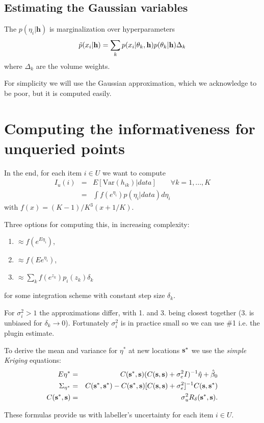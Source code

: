 \documentclass[10pt, onecolumn]{article}
\newcommand{\y}{\mathbf{h}}
\begin{document}
\subsection{Estimating the Gaussian variables}

The $p(\eta_i|\y)$ is marginalization over hyperparameters
\begin{eqnarray}
\tilde p(x_i|\y) = \sum_k p(x_i|\bold\theta_k, \y) p(\bold\theta_k | \y) \Delta_k
\end{eqnarray}
where $\Delta_k$ are the volume weights.

For simplicity we will use the Gaussian approximation, which we acknowledge to be poor, but it is computed easily.


\section*{Computing the informativeness for unqueried points}

In the end, for each item $i\in U$ we want to compute 
\begin{eqnarray}
I_u(i) &=& E[\mathrm{Var }(h_{ik}) | data]\qquad \forall k=1,...,K\\
&=& \int f(e^{\eta_i}) p(\eta_i | data) d\eta_i
\end{eqnarray}
with $f(x)=(K-1)/K^3(x+1/K)$.

Three options for computing this, in increasing complexity:
\begin{enumerate}
\item $\approx f(e^{E \eta_i})$,
\item $\approx f(E e^{\eta_i})$,
\item $\approx \sum_k f(e^{z_{k}})p_i(z_k) \delta_k$
\end{enumerate}
for some integration scheme with constant step size $\delta_k$. 

For $\sigma_i^2>1$ the approximations differ, with 1. and 3. being closest together (3. is unbiased for $\delta_k \rightarrow 0$). Fortunately $\sigma_i^2$ is in practice small so we can use \#1 i.e. the plugin estimate.

To derive the mean and variance for $\eta^*$ at new locations $\bold s^*$ we use the \textit{simple Kriging} equations:
\begin{eqnarray}
E\eta^*  &=&  C(\bold s^*, \bold s)(C(\bold s, \bold s)+\sigma_e^2 I)^{-1} \hat \eta + \hat \beta_0\\
\Sigma_{\eta^*} &=& C(\bold s^*, \bold s^*) - C(\bold s^*, \bold s)[C(\bold s, \bold s) + \sigma_e^2]^{-1} C(\bold s,\bold s^*)\\
C(\bold s^*, \bold s) &=& \sigma_u^2 R_\delta(\bold s^*,\bold s).
\end{eqnarray}

These formulas provide us with labeller's uncertainty for each item $i\in U$.
\end{document}
